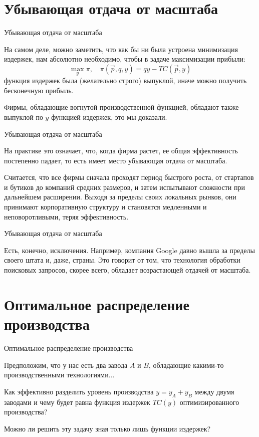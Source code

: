 \documentclass{beamer}
\begin{document}
\section{Убывающая отдача от масштаба}

\begin{frame}{Убывающая отдача от масштаба}

На самом деле, можно заметить, что как бы ни была устроена минимизация издержек, нам абсолютно необходимо, чтобы в задаче максимизации прибыли:
$$ \max_{y} \pi, \quad \pi(\vec p, q, y) = q y - TC(\vec p, y)$$
функция издержек была (желательно строго) выпуклой, иначе можно получить бесконечную прибыль.

Фирмы, обладающие вогнутой производственной функцией, обладают также выпуклой по $y$ функцией издержек, это мы доказали.

\end{frame}

\begin{frame}{Убывающая отдача от масштаба}

На практике это означает, что, когда фирма растет, ее общая эффективность постепенно падает, то есть имеет место \alert{убывающая отдача от масштаба}.

Считается, что все фирмы сначала проходят период быстрого роста, от стартапов и бутиков до компаний средних размеров, и затем испытывают сложности при дальнейшем расширении. Выходя за пределы своих локальных рынков, они принимают корпоративную структуру и становятся медленными и неповоротливыми, теряя эффективность.

\end{frame}

\begin{frame}{Убывающая отдача от масштаба}

Есть, конечно, исключения. Например, компания Google давно вышла за пределы своего штата и, даже, страны. Это говорит от том, что технология обработки поисковых запросов, скорее всего, обладает возрастающей отдачей от масштаба.

\end{frame}

\section{Оптимальное распределение производства}

\begin{frame}{Оптимальное распределение производства}

Предположим, что у нас есть два завода $A$ и $B$, обладающие какими-то производственными технологиями...

Как эффективно разделить уровень производства $y = y_A + y_B$ между двумя заводами и чему будет равна функция издержек $TC(y)$ оптимизированного производства? 

Можно ли решить эту задачу зная только лишь функции издержек?

\end{frame}
\end{document}
